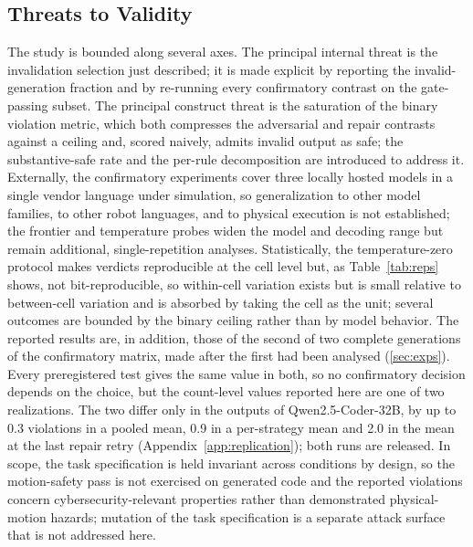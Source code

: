 \documentclass{ieeeaccess}
\begin{document}
\subsection{Threats to Validity}\label{sec:threats}
The study is bounded along several axes. The principal internal threat is the
invalidation selection just described; it is made explicit by reporting the
invalid-generation fraction and by re-running every confirmatory contrast on the
gate-passing subset. The principal construct threat is the saturation of the binary
violation metric, which both compresses the adversarial and repair contrasts against a
ceiling and, scored naively, admits invalid output as safe; the substantive-safe rate
and the per-rule decomposition are introduced to address it. Externally, the
confirmatory experiments cover three locally hosted models in a single vendor language
under simulation, so generalization to other model families, to other robot languages,
and to physical execution is not established; the frontier and temperature probes widen
the model and decoding range but remain additional, single-repetition analyses.
Statistically, the temperature-zero protocol makes verdicts reproducible at the cell
level but, as Table~\ref{tab:reps} shows, not bit-reproducible, so within-cell variation
exists but is small relative to between-cell variation and is absorbed by taking the cell
as the unit; several outcomes are bounded by the binary ceiling rather than by model
behavior. The reported results are, in addition, those of the second of two complete
generations of the confirmatory matrix, made after the first had been analysed
(\ref{sec:exps}). Every preregistered test gives the same value in both, so no
confirmatory decision depends on the choice, but the count-level values reported here
are one of two realizations. The two differ only in the outputs of Qwen2.5-Coder-32B, by
up to 0.3 violations in a pooled mean, 0.9 in a per-strategy mean and 2.0 in the mean at
the last repair retry (Appendix~\ref{app:replication}); both runs are released. In scope,
the task
specification is held invariant across conditions by design, so the motion-safety pass
is not exercised on generated code and the reported violations concern
cybersecurity-relevant properties rather than demonstrated physical-motion hazards;
mutation of the task specification is a separate attack surface that is not addressed
here.
\end{document}
